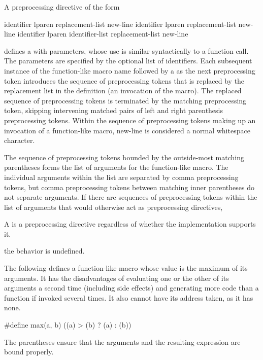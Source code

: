 \pnum
A preprocessing directive of the form
\begin{ncsimplebnf}
 identifier lparen  \terminal{)} replacement-list new-line\br
{} identifier lparen  \terminal{)} replacement-list new-line\br
{} identifier lparen identifier-list  \terminal{)} replacement-list new-line
\end{ncsimplebnf}
defines a 
with parameters, whose use is
similar syntactically to a function call.
The parameters
%
are specified by the optional list of identifiers.
Each subsequent instance of the function-like macro name followed by a
\tcode{(}
as the next preprocessing token
introduces the sequence of preprocessing tokens that is replaced
by the replacement list in the definition
(an invocation of the macro).
%
The replaced sequence of preprocessing tokens is terminated by the matching
\tcode{)}
preprocessing token, skipping intervening matched pairs of left and
right parenthesis preprocessing tokens.
Within the sequence of preprocessing tokens making up an invocation
of a function-like macro,
new-line is considered a normal whitespace character.

\pnum
{}%
The sequence of preprocessing tokens
bounded by the outside-most matching parentheses
forms the list of arguments for the function-like macro.
The individual arguments within the list
are separated by comma preprocessing tokens,
but comma preprocessing tokens between matching
inner parentheses do not separate arguments.
If there are sequences of preprocessing tokens within the list of
arguments that would otherwise act as preprocessing directives,
\begin{footnote}
A  is a preprocessing directive regardless of whether the implementation supports it.
\end{footnote}
the behavior is undefined.

\pnum
\begin{example}
The following defines a function-like
macro whose value is the maximum of its arguments.
It has the disadvantages of evaluating one or the other of its arguments
a second time
(including
%
side effects)
and generating more code than a function if invoked several times.
It also cannot have its address taken,
as it has none.

\begin{codeblock}
#define max(a, b) ((a) > (b) ? (a) : (b))
\end{codeblock}

The parentheses ensure that the arguments and
the resulting expression are bound properly.
\end{example}

